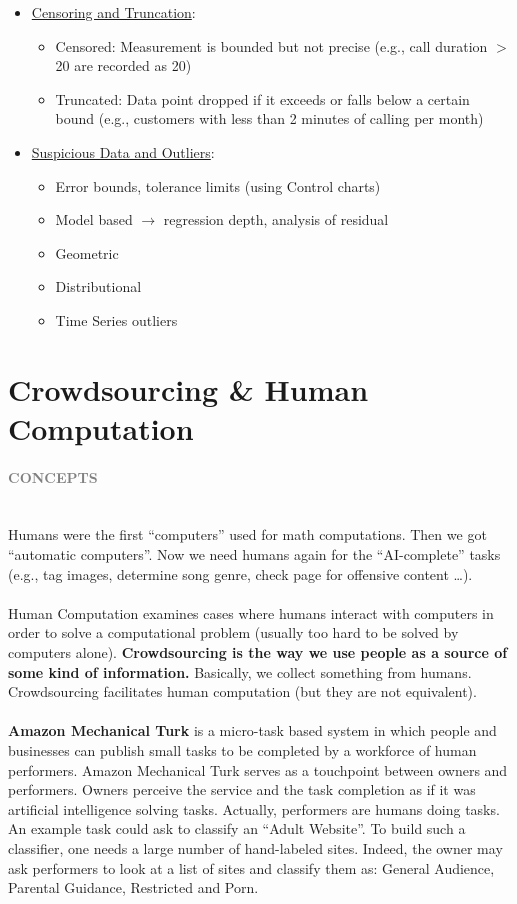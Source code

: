 \documentclass[10pt,a4paper]{article}
\newcommand{\nline}{\\~\\}
\newcommand{\myparagraph}[1]{\paragraph{\normalsize{\textcolor{gray}{\uppercase{\textbf{#1}}}} }\mbox{} \vspace{0.5em}\\}
\begin{document}
\begin{itemize}
\begin{itemize}
	\end{itemize}
	\item \uline{Censoring and Truncation}:
	\begin{itemize}
		\item Censored: Measurement is bounded but not precise (e.g., call duration $>$ 20 are recorded as 20)
		\item Truncated: Data point dropped if it exceeds or falls below a certain bound (e.g., customers with less than 2 minutes of calling per month)
	\end{itemize}
	\item \uline{Suspicious Data and Outliers}:
	\begin{itemize}
		\item Error bounds, tolerance limits (using Control charts)
		\item Model based $\rightarrow$ regression depth, analysis of residual
		\item Geometric
		\item Distributional
		\item Time Series outliers
	\end{itemize}
\end{itemize}

\pagebreak
\section{Crowdsourcing \& Human Computation}
\myparagraph{Concepts}
Humans were the first “computers” used for math computations. Then we got “automatic computers”. Now we need humans again for the “AI-complete” tasks (e.g., tag images, determine song genre, check page for offensive content …).
\nline
Human Computation examines cases where humans interact with computers in order to solve a computational problem (usually too hard to be solved by computers alone). \textbf{Crowdsourcing is the way we use people as a source of some kind of information.} Basically, we collect something from humans. Crowdsourcing facilitates human computation (but they are not equivalent). 
\nline
\textbf{Amazon Mechanical Turk} is a micro-task based system in which people and businesses can publish small tasks to be completed by a workforce of human performers. Amazon Mechanical Turk serves as a touchpoint between owners and performers. Owners perceive the service and the task completion as if it was artificial intelligence solving tasks. Actually, performers are humans doing tasks. \\
An example task could ask to classify an “Adult Website”. To build such a classifier, one needs a large number of hand-labeled sites. Indeed, the owner may ask performers to look at a list of sites and classify them as: General Audience, Parental Guidance, Restricted and Porn.
\end{document}

